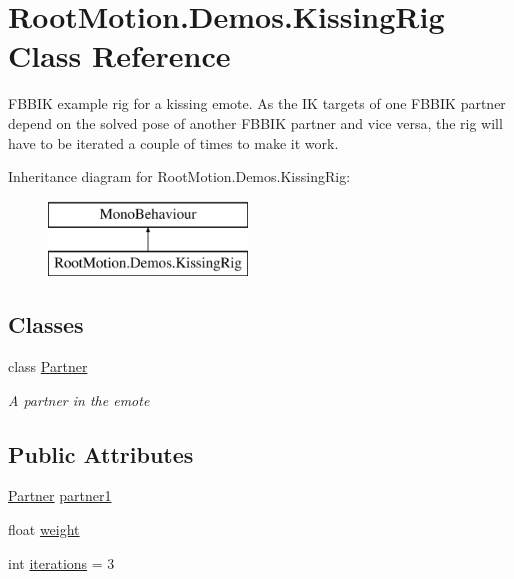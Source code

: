 \hypertarget{class_root_motion_1_1_demos_1_1_kissing_rig}{}\section{Root\+Motion.\+Demos.\+Kissing\+Rig Class Reference}
\label{class_root_motion_1_1_demos_1_1_kissing_rig}


F\+B\+B\+IK example rig for a kissing emote. As the IK targets of one F\+B\+B\+IK partner depend on the solved pose of another F\+B\+B\+IK partner and vice versa, the rig will have to be iterated a couple of times to make it work.  


Inheritance diagram for Root\+Motion.\+Demos.\+Kissing\+Rig\+:\begin{figure}[H]
\begin{center}
\leavevmode
\includegraphics[height=2.000000cm]{class_root_motion_1_1_demos_1_1_kissing_rig}
\end{center}
\end{figure}
\subsection*{Classes}
\begin{DoxyCompactItemize}
\item 
class \mbox{\hyperlink{class_root_motion_1_1_demos_1_1_kissing_rig_1_1_partner}{Partner}}
\begin{DoxyCompactList}\small\item\em A partner in the emote \end{DoxyCompactList}\end{DoxyCompactItemize}
\subsection*{Public Attributes}
\begin{DoxyCompactItemize}
\item 
\mbox{\hyperlink{class_root_motion_1_1_demos_1_1_kissing_rig_1_1_partner}{Partner}} \mbox{\hyperlink{class_root_motion_1_1_demos_1_1_kissing_rig_ae772b8c98448bccb3433811138fe0d64}{partner1}}
\item 
float \mbox{\hyperlink{class_root_motion_1_1_demos_1_1_kissing_rig_a687c2a0ee27e71c487681e4f81eb41c7}{weight}}
\item 
int \mbox{\hyperlink{class_root_motion_1_1_demos_1_1_kissing_rig_a53f93bef0ed545bc7ac7dcb3f37ae1d5}{iterations}} = 3
\end{DoxyCompactItemize}


